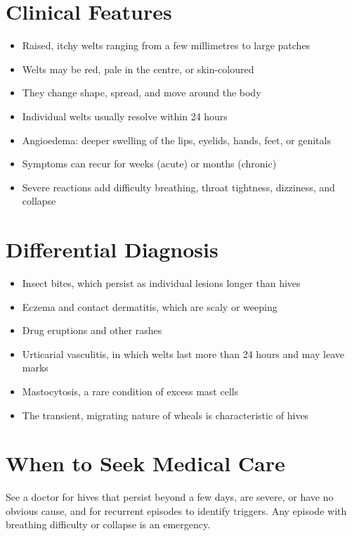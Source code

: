 \section*{Clinical Features}
\begin{itemize}
    \item Raised, itchy welts ranging from a few millimetres to large patches
    \item Welts may be red, pale in the centre, or skin-coloured
    \item They change shape, spread, and move around the body
    \item Individual welts usually resolve within 24 hours
    \item Angioedema: deeper swelling of the lips, eyelids, hands, feet, or genitals
    \item Symptoms can recur for weeks (acute) or months (chronic)
    \item Severe reactions add difficulty breathing, throat tightness, dizziness, and collapse
\end{itemize}

\section*{Differential Diagnosis}
\begin{itemize}
    \item Insect bites, which persist as individual lesions longer than hives
    \item Eczema and contact dermatitis, which are scaly or weeping
    \item Drug eruptions and other rashes
    \item Urticarial vasculitis, in which welts last more than 24 hours and may leave marks
    \item Mastocytosis, a rare condition of excess mast cells
    \item The transient, migrating nature of wheals is characteristic of hives
\end{itemize}

\section*{When to Seek Medical Care}
See a doctor for hives that persist beyond a few days, are severe, or have no obvious cause, and for recurrent episodes to identify triggers. Any episode with breathing difficulty or collapse is an emergency.

